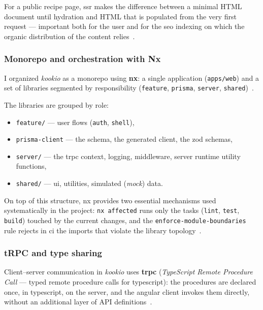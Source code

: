 For a public recipe page, \acrshort{ssr} makes the difference between a minimal HTML document until \gls{hydration} and HTML that is populated from the very first request --- important both for the user and for the \acrshort{seo} indexing on which the organic distribution of the content relies~\cite{analog}.

\subsubsection{Monorepo and orchestration with Nx}\label{subsec:monorepo-nx}

I organized \textit{\gls{kookio}} as a \gls{monorepo} using \textbf{\gls{nx}}: a single application (\texttt{apps/web}) and a set of libraries segmented by responsibility (\texttt{feature}, \texttt{prisma}, \texttt{server}, \texttt{shared})~\cite{nx}.

The libraries are grouped by role:
\begin{itemize}
  \item \texttt{feature/} --- user flows (\texttt{auth}, \texttt{shell}),
  \item \texttt{prisma-client} --- the schema, the generated client, the \gls{zod} schemas,
  \item \texttt{server/} --- the \gls{trpc} context, logging, middleware, server runtime utility functions,
  \item \texttt{shared/} --- \acrshort{ui}, utilities, simulated (\textit{mock}) data.
\end{itemize}

On top of this structure, \gls{nx} provides two essential mechanisms used systematically in the project: \texttt{nx affected} runs only the tasks (\texttt{lint}, \texttt{test}, \texttt{build}) touched by the current changes, and the \texttt{enforce-module-boundaries} rule rejects in \acrshort{ci} the imports that violate the library topology~\cite{nx}.

\subsubsection{tRPC and type sharing}\label{subsec:trpc}

Client--server communication in \textit{\gls{kookio}} uses \textbf{\gls{trpc}} (\textit{TypeScript Remote Procedure Call} --- typed remote procedure calls for \gls{typescript}): the procedures are declared once, in \gls{typescript}, on the server, and the \gls{angular} client invokes them directly, without an additional layer of API definitions~\cite{trpc}.

